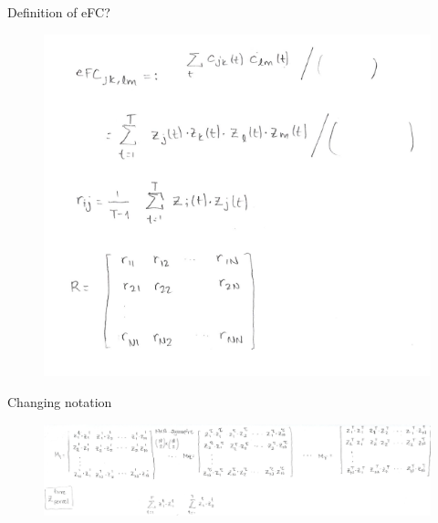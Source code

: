 \documentclass{beamer}
\begin{document}
\begin{frame}{Definition of eFC?}
	\begin{figure}[h]
	\centering
		\includegraphics[scale=0.4]{../Figures/fig_novelli_description5.png}
\end{figure}
\end{frame}

\begin{frame}{Changing notation}
\begin{figure}[h]
	\centering
		\includegraphics[scale=0.4]{../Figures/fig_novelli_description6.png}
\end{figure}	
\end{frame}
\end{document}
